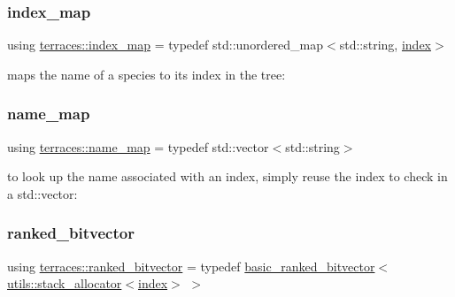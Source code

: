 \subsubsection{\texorpdfstring{index\+\_\+map}{index\_map}}
{\footnotesize\ttfamily using \hyperlink{namespaceterraces_a148f3e895119c2a72d995caae669e40d}{terraces\+::index\+\_\+map} = typedef std\+::unordered\+\_\+map$<$std\+::string, \hyperlink{namespaceterraces_adbc33ccb543d1634e96d0eb02e472c77}{index}$>$}



maps the name of a species to it\textquotesingle{}s index in the tree\+: 

\mbox{\label{namespaceterraces_a4ef0217fe5aed881737d9bc5a8d45dca}} 
\subsubsection{\texorpdfstring{name\+\_\+map}{name\_map}}
{\footnotesize\ttfamily using \hyperlink{namespaceterraces_a4ef0217fe5aed881737d9bc5a8d45dca}{terraces\+::name\+\_\+map} = typedef std\+::vector$<$std\+::string$>$}

to look up the name associated with an index, simply reuse the index to check in a std\+::vector\+: \mbox{\label{namespaceterraces_acc45ec9c561024c50ecbce5b6738ba08}} 
\subsubsection{\texorpdfstring{ranked\+\_\+bitvector}{ranked\_bitvector}}
{\footnotesize\ttfamily using \hyperlink{namespaceterraces_acc45ec9c561024c50ecbce5b6738ba08}{terraces\+::ranked\+\_\+bitvector} = typedef \hyperlink{classterraces_1_1basic__ranked__bitvector}{basic\+\_\+ranked\+\_\+bitvector}$<$\hyperlink{classterraces_1_1utils_1_1stack__allocator}{utils\+::stack\+\_\+allocator}$<$\hyperlink{namespaceterraces_adbc33ccb543d1634e96d0eb02e472c77}{index}$>$ $>$}

\mbox{\label{namespaceterraces_a07aaf7feec4a22c6cdefc14c5a81bdd0}} 

